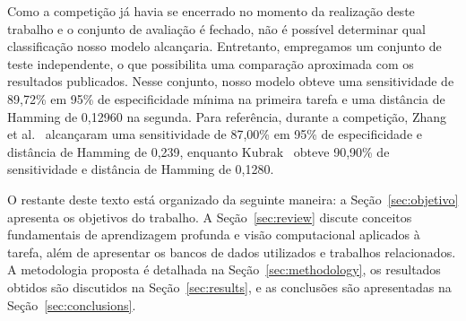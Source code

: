\documentclass[12pt]{article}
\begin{document}
Como a competição já havia se encerrado no momento da realização deste trabalho e o conjunto de avaliação é fechado, não é possível determinar qual classificação nosso modelo alcançaria. Entretanto, empregamos um conjunto de teste independente, o que possibilita uma comparação aproximada com os resultados publicados. Nesse conjunto, nosso modelo obteve uma sensitividade de 89,72\% em 95\% de especificidade mínima na primeira tarefa e uma distância de Hamming de 0,12960 na segunda. Para referência, durante a competição, Zhang et al.~\cite{justraigs_zhang} alcançaram uma sensitividade de 87,00\% em 95\% de especificidade e distância de Hamming de 0,239, enquanto Kubrak~\cite{justraigs_kubrak} obteve 90,90\% de sensitividade e distância de Hamming de 0,1280.

O restante deste texto está organizado da seguinte maneira: a Seção~\ref{sec:objetivo} apresenta os objetivos do trabalho. A Seção~\ref{sec:review} discute conceitos fundamentais de aprendizagem profunda e visão computacional aplicados à tarefa, além de apresentar os bancos de dados utilizados e trabalhos relacionados. A metodologia proposta é detalhada na Seção~\ref{sec:methodology}, os resultados obtidos são discutidos na Seção~\ref{sec:results}, e as conclusões são apresentadas na Seção~\ref{sec:conclusions}.

\end{document}
